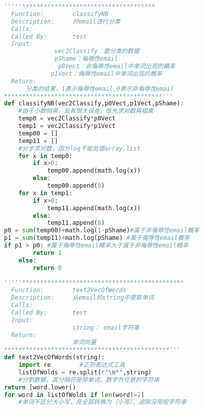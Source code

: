 \begin{lstlisting}[language=python]
'''''************************************* 
  Function:        classifyNB 
  Description:     对email进行分类 
  Calls:            
  Called By:       test 
  Input: 
              vec2Classify：要分类的数据 
              pShame：侮辱性email 
               p0Vect：非侮辱性email中单词出现的概率 
             p1Vect：侮辱性email中单词出现的概率 
  Return:           
      分类的结果，1表示侮辱性email,0表示非侮辱性email 
********************************************'''  
def classifyNB(vec2Classify,p0Vect,p1Vect,pShame):  
    #由于小数相乘，会有很大误差，故先求对数再相乘  
    temp0 = vec2Classify*p0Vect   
    temp1 = vec2Classify*p1Vect  
    temp00 = []   
    temp11 = []  
    #分步求对数，因为log不能处理array,list  
    for x in temp0:  
        if x>0:  
            temp00.append(math.log(x))   
        else:  
            temp00.append(0)  
    for x in temp1:  
        if x>0:  
            temp11.append(math.log(x))   
        else:  
            temp11.append(0)  
p0 = sum(temp00)+math.log(1-pShame)#属于非侮辱性email概率  
p1 = sum(temp11)+math.log(pShame) #属于侮辱性email概率  
if p1 > p0: #属于侮辱性email概率大于属于非侮辱性email概率  
        return 1  
    else:  
        return 0  
  
'''''********************************************* 
  Function:        text2VecOfWords 
  Description:     从email的string中提取单词 
  Calls:            
  Called By:       test 
  Input: 
                   string： email字符串 
  Return:           
                   单词向量 
**********************************************'''  
def text2VecOfWords(string):  
    import re        #正则表达式工具  
    listOfWolds = re.split(r"\W*",string)  
    #分割数据，其分隔符是除单词，数字外任意的字符串   
return [word.lower() 
for word in listOfWolds if len(word)>2]  
    #单词不区分大小写，及全部转换为（小写），滤除没用短字符串  
  

\end{lstlisting}
